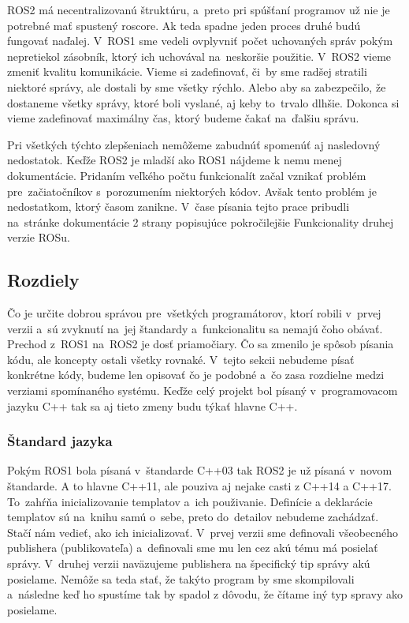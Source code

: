 ROS2 má necentralizovanú štruktúru, a~preto pri spúšťaní programov už nie je potrebné mať spustený roscore. Ak teda spadne jeden proces druhé budú
fungovať naďalej. V~ROS1 sme vedeli ovplyvniť počet uchovaných správ pokým nepretiekol zásobník, ktorý ich uchovával na~neskoršie použitie. V~ROS2
vieme zmeniť kvalitu komunikácie. Vieme si zadefinovať, či~by sme radšej stratili niektoré správy, ale dostali by sme všetky rýchlo. Alebo aby sa zabezpečilo,
že dostaneme všetky správy, ktoré boli vyslané, aj keby to~trvalo dlhšie. Dokonca si vieme zadefinovať maximálny čas, ktorý budeme čakať na~ďalšiu správu.

Pri všetkých týchto zlepšeniach nemôžeme zabudnúť spomenúť aj nasledovný nedostatok. Keďže ROS2 je mladší ako ROS1 nájdeme k nemu menej dokumentácie.
Pridaním veľkého počtu funkcionalít začal vznikať problém pre~začiatočníkov s~porozumením niektorých kódov. Avšak tento problém je nedostatkom,
ktorý časom zanikne. V~čase písania tejto prace pribudli na~stránke dokumentácie 2 strany popisujúce pokročilejšie Funkcionality druhej verzie ROSu.

\subsection{Rozdiely}

Čo je určite dobrou správou pre~všetkých programátorov, ktorí robili v~prvej verzii a~sú zvyknutí na~jej štandardy a~funkcionalitu sa nemajú čoho obávať.
Prechod z~ROS1 na~ROS2 je dosť priamočiary. Čo sa zmenilo je spôsob písania kódu, ale koncepty ostali všetky rovnaké. V~tejto sekcii nebudeme
písať konkrétne kódy, budeme len opisovať čo je podobné a~čo zasa rozdielne medzi verziami spomínaného systému. Keďže celý projekt bol písaný v~programovacom
jazyku C++ tak sa aj tieto zmeny budu týkať hlavne C++.

\subsubsection{Štandard jazyka}

	Pokým ROS1 bola písaná v~štandarde C++03 tak ROS2 je už písaná v~novom štandarde. A to hlavne C++11, ale pouziva aj nejake casti z C++14 a C++17.
	To~zahŕňa inicializovanie templatov a~ich použivanie. Definície a deklarácie templatov sú na~knihu samú o~sebe, preto do~detailov nebudeme zachádzať.
	Stačí nám vedieť, ako ich inicializovať. V~prvej verzii sme definovali všeobecného publishera (publikovateľa) a~definovali sme mu len cez akú tému má posielať
	správy. V~druhej verzii naväzujeme publishera na špecifický tip správy akú posielame. Nemôže sa teda stať, že takýto program by sme skompilovali a~následne
	keď ho spustíme tak by spadol z dôvodu, že čítame iný typ spravy ako posielame.

